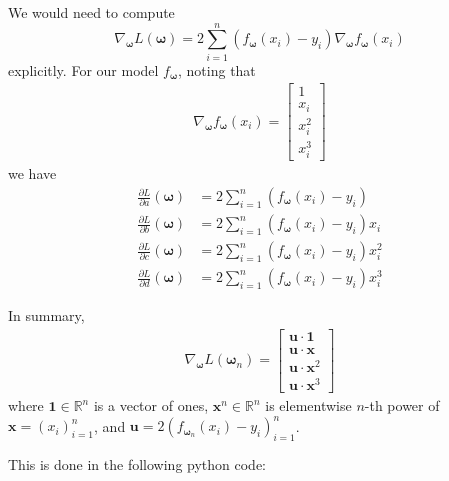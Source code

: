 \documentclass[
]{article}
\begin{document}
We would need to compute \[
\nabla_{\boldsymbol{\omega}} L(\boldsymbol{\omega}) = 2 \sum_{i=1}^{n} (f_{\boldsymbol{\omega}}(x_i) - y_i) \nabla_{\boldsymbol{\omega}} f_{\boldsymbol{\omega}}(x_i)
\] explicitly. For our model \(f_{\boldsymbol{\omega}}\), noting that
\begin{align*}
    \nabla_{\boldsymbol{\omega}} f_{\boldsymbol{\omega}}(x_i) = \begin{bmatrix} 1 \\ x_i \\ x_i^2 \\ x_i^3 \end{bmatrix} 
\end{align*} we have \begin{align*}
    \frac{\partial L}{\partial a}(\boldsymbol{\omega}) & = 2 \sum_{i=1}^{n} (f_{\boldsymbol{\omega}}(x_i) - y_i)
    \\
    \frac{\partial L}{\partial b}(\boldsymbol{\omega}) &= 2 \sum_{i=1}^{n} (f_{\boldsymbol{\omega}}(x_i) - y_i) x_i
    \\
    \frac{\partial L}{\partial c}(\boldsymbol{\omega}) &= 2 \sum_{i=1}^{n} (f_{\boldsymbol{\omega}}(x_i) - y_i) x_i^2
    \\
    \frac{\partial L}{\partial d}(\boldsymbol{\omega}) &= 2 \sum_{i=1}^{n} ( f_{\boldsymbol{\omega}}(x_i) - y_i) x_i^3
\end{align*}

In summary, \begin{align*}
    \nabla_{\boldsymbol{\omega}} L(\boldsymbol{\omega}_n) = \begin{bmatrix} \mathbf{u}\cdot \boldsymbol{1} \\ \mathbf{u}\cdot \mathbf{x}\\ \mathbf{u}\cdot \mathbf{x}^2 \\ \mathbf{u}\cdot \mathbf{x}^3 \end{bmatrix} 
\end{align*} where \(\boldsymbol{1} \in \mathbb{R}^n\) is a vector of
ones, \(\mathbf{x}^n \in \mathbb{R}^n\) is elementwise \(n\)-th power of
\(\mathbf{x}= (x_i)_{i=1}^n\), and
\(\mathbf{u}= 2 (f_{\boldsymbol{\omega}_n}(x_i) - y_i)_{i=1}^n\).

This is done in the following python code:
\end{document}
